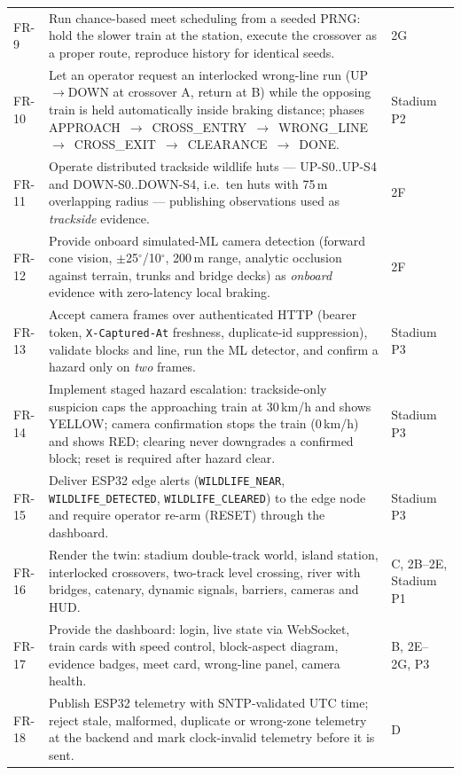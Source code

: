 \begin{longtable}{>{\raggedright}p{0.8cm} >{\raggedright\arraybackslash}p{10.6cm} l}
FR-9 & Run chance-based meet scheduling from a seeded PRNG: hold the slower train at the station, execute the crossover as a proper route, reproduce history for identical seeds. & 2G \\
FR-10 & Let an operator request an interlocked wrong-line run (UP$\rightarrow$DOWN at crossover A, return at B) while the opposing train is held automatically inside braking distance; phases APPROACH~$\rightarrow$~CROSS\_ENTRY~$\rightarrow$~WRONG\_LINE~$\rightarrow$~CROSS\_EXIT~$\rightarrow$~CLEARANCE~$\rightarrow$~DONE. & Stadium P2 \\
FR-11 & Operate distributed trackside wildlife huts --- UP-S0..UP-S4 and DOWN-S0..DOWN-S4, i.e.\ ten huts with 75\,m overlapping radius --- publishing observations used as \emph{trackside} evidence. & 2F \\
FR-12 & Provide onboard simulated-ML camera detection (forward cone vision, $\pm$25$^\circ$/10$^\circ$, 200\,m range, analytic occlusion against terrain, trunks and bridge decks) as \emph{onboard} evidence with zero-latency local braking. & 2F \\
FR-13 & Accept camera frames over authenticated HTTP (bearer token, \texttt{X-Captured-At} freshness, duplicate-id suppression), validate blocks and line, run the ML detector, and confirm a hazard only on \emph{two} frames. & Stadium P3 \\
FR-14 & Implement staged hazard escalation: trackside-only suspicion caps the approaching train at 30\,km/h and shows YELLOW; camera confirmation stops the train (0\,km/h) and shows RED; clearing never downgrades a confirmed block; reset is required after hazard clear. & Stadium P3 \\
FR-15 & Deliver ESP32 edge alerts (\texttt{WILDLIFE\_NEAR}, \texttt{WILDLIFE\_DETECTED}, \texttt{WILDLIFE\_CLEARED}) to the edge node and require operator re-arm (RESET) through the dashboard. & Stadium P3 \\
FR-16 & Render the twin: stadium double-track world, island station, interlocked crossovers, two-track level crossing, river with bridges, catenary, dynamic signals, barriers, cameras and HUD. & C, 2B--2E, Stadium P1 \\
FR-17 & Provide the dashboard: login, live state via WebSocket, train cards with speed control, block-aspect diagram, evidence badges, meet card, wrong-line panel, camera health. & B, 2E--2G, P3 \\
FR-18 & Publish ESP32 telemetry with SNTP-validated UTC time; reject stale, malformed, duplicate or wrong-zone telemetry at the backend and mark clock-invalid telemetry before it is sent. & D \\
\bottomrule
\end{longtable}

